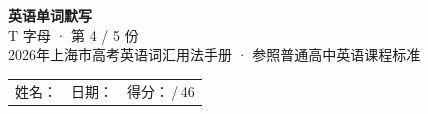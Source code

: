 \documentclass[10pt,a4paper]{article}
\begin{document}
\pagestyle{plain}

\begin{center}
{\LARGE\bfseries 英语单词默写}\\[0.22em]
{\large T 字母 · 第 4 / 5 份}\\[0.18em]
{\small 2026年上海市高考英语词汇用法手册 · 参照普通高中英语课程标准}
\end{center}

\vspace{0.25em}
\noindent\begin{tabular}{@{}p{}@{}p{}@{}p{}@{}}
姓名：\underline{\hspace{2.0cm}} & 日期：\underline{\hspace{2.0cm}} & 得分：\underline{\hspace{1.3cm}}\,/\,46 \\
\end{tabular}

\vspace{0.3em}

\vspace{0.08em}
\end{document}
